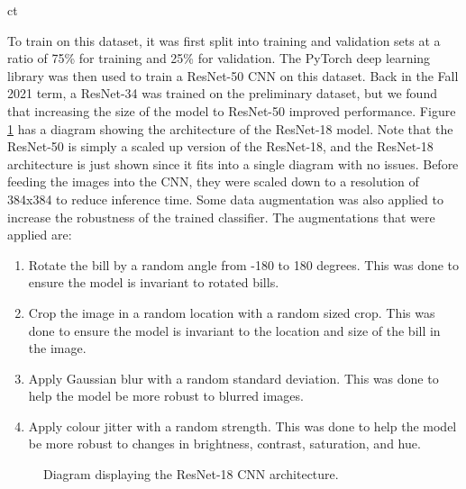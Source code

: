 ct\documentclass[a4paper,11pt]{article}
\begin{document}
To train on this dataset, it was first split into training and validation sets at a ratio of 75\% for training and 25\% for validation. The PyTorch deep learning library was then used to train a ResNet-50 CNN on this dataset. Back in the Fall 2021 term, a ResNet-34 was trained on the preliminary dataset, but we found that increasing the size of the model to ResNet-50 improved performance. Figure \ref{fig:resnet} has a diagram showing the architecture of the ResNet-18 model. Note that the ResNet-50 is simply a scaled up version of the ResNet-18, and the ResNet-18 architecture is just shown since it fits into a single diagram with no issues. Before feeding the images into the CNN, they were scaled down to a resolution of 384x384 to reduce inference time. Some data augmentation was also applied to increase the robustness of the trained classifier. The augmentations that were applied are:

\begin{enumerate}
    \item Rotate the bill by a random angle from -180 to 180 degrees. This was done to ensure the model is invariant to rotated bills.
    \item Crop the image in a random location with a random sized crop. This was done to ensure the model is invariant to the location and size of the bill in the image.
    \item Apply Gaussian blur with a random standard deviation. This was done to help the model be more robust to blurred images.
    \item Apply colour jitter with a random strength. This was done to help the model be more robust to changes in brightness, contrast, saturation, and hue.
\end{enumerate}

\begin{figure}[H]
\centering
{}
\caption{Diagram displaying the ResNet-18 CNN architecture. \cite{resnet}}
\label{fig:resnet}
\end{figure}
\end{document}
